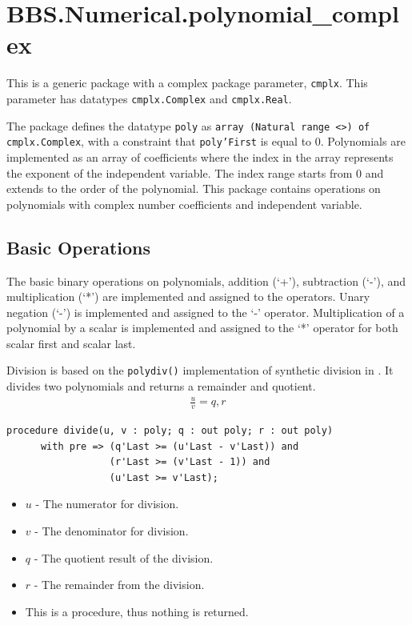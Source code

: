 \documentclass[10pt, openany]{book}
\newcommand{\indexfunc}[1]{\index[func]{#1}}
\newcommand{\function}[1]{\texttt{#1}}
\newcommand{\datatype}[1]{\texttt{#1}}
\begin{document}
\section{BBS.Numerical.polynomial\_complex}
This is a generic package with a complex package parameter, \datatype{cmplx}.  This parameter has datatypes \datatype{cmplx.Complex} and \datatype{cmplx.Real}.

The package defines the datatype \datatype{poly} as \datatype{array (Natural range  <>) of cmplx.Complex}, with a constraint that \datatype{poly'First} is equal to 0.  Polynomials are implemented as an array of coefficients where the index in the array represents the exponent of the independent variable.  The index range starts from 0 and extends to the order of the polynomial.  This package contains operations on polynomials with complex number coefficients and independent variable.

\subsection{Basic Operations}
The basic binary operations on polynomials, addition (`+'), subtraction (`-'), and multiplication (`*') are implemented and assigned to the operators.  Unary negation (`-') is implemented and assigned to the `-' operator.  Multiplication of a polynomial by a scalar is implemented and assigned to the `*' operator for both scalar first and scalar last.

Division is based on the \function{polydiv()} implementation of synthetic division in \cite{NR-C}.  It divides two polynomials and returns a remainder and quotient.
\begin{align*}
  \frac{u}{v} = q, r
\end{align*}
\begin{lstlisting}
procedure divide(u, v : poly; q : out poly; r : out poly)
      with pre => (q'Last >= (u'Last - v'Last)) and
                  (r'Last >= (v'Last - 1)) and
                  (u'Last >= v'Last);
\end{lstlisting}
\indexfunc{poly-divide}
\begin{itemize}
  \item $u$ - The numerator for division.
  \item $v$ - The denominator for division.
  \item $q$ - The quotient result of the division.
  \item $r$ - The remainder from the division.
  \item This is a procedure, thus nothing is returned.
\end{itemize}
\end{document}
